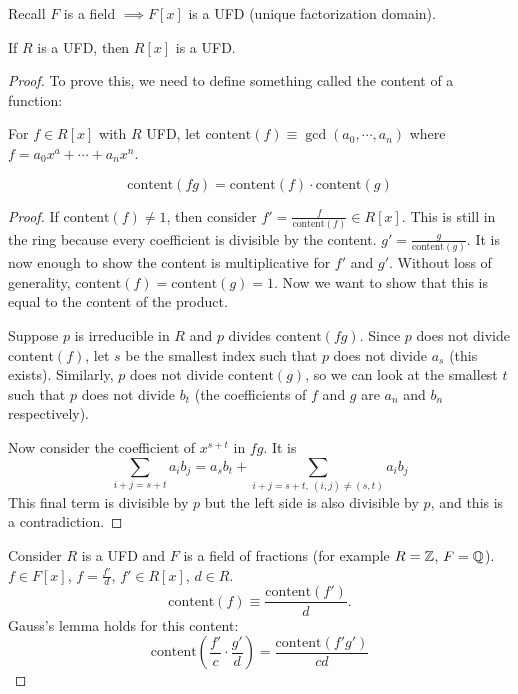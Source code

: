 \documentclass[a4paper,twoside,master.tex]{subfiles}
\begin{document}
Recall $ F $ is a field $ \implies F[x] $ is a UFD (unique factorization domain).
\begin{theorem}
    If $ R $ is a UFD, then $ R[x] $ is a UFD.
\end{theorem}
\begin{proof}
    To prove this, we need to define something called the content of a function:
    \begin{definition}
        For $ f \in R[x] $ with $ R $ UFD, let $ \text{content}(f) \equiv \gcd(a_0 ,\cdots, a_n) $ where $ f = a_0 x^a + \cdots + a_n x^n $.
    \end{definition}
    \begin{lemma}
        \begin{equation}
            \text{content}(fg) = \text{content}(f) \cdot \text{content}(g)
        \end{equation}
    \end{lemma}
    \begin{proof}
        If $ \text{content}(f) \neq 1 $, then consider $ f' = \frac{f}{\text{content}(f)} \in R[x] $. This is still in the ring because every coefficient is divisible by the content. $ g' = \frac{g}{\text{content}(g)} $. It is now enough to show the content is multiplicative for $ f' $ and $ g' $. Without loss of generality, $ \text{content}(f) = \text{content}(g) = 1 $. Now we want to show that this is equal to the content of the product.

        Suppose $ p $ is irreducible in $ R $ and $ p $ divides $ \text{content}(fg) $. Since $ p $ does not divide $ \text{content}(f) $, let $ s $ be the smallest index such that $ p $ does not divide $ a_s $ (this exists). Similarly, $ p $ does not divide $ \text{content}(g) $, so we can look at the smallest $ t $ such that $ p $ does not divide $ b_t $ (the coefficients of $ f $ and $ g $ are $ a_n $ and $ b_n $ respectively).

        Now consider the coefficient of $ x^{s+t} $ in $ fg $. It is 
        \begin{equation}
            \sum_{i+j = s + t} a_i b_j = a_s b_t + \sum_{i+j = s + t,\ (i,j) \neq (s,t)} a_i b_j
        \end{equation}
        This final term is divisible by $ p $ but the left side is also divisible by $ p $, and this is a contradiction.
    \end{proof}
    Consider $ R $ is a UFD and $ F $ is a field of fractions (for example $ R = \mathbb{Z} $, $ F = \mathbb{Q} $). $ f \in F[x] $, $ f = \frac{f'}{d} $, $ f' \in R[x] $, $ d \in R $.
    \begin{equation}
        \text{content}(f) \equiv \frac{\text{content}(f')}{d}.
    \end{equation}
    Gauss's lemma holds for this content:
    \begin{equation}
        \text{content}\left( \frac{f'}{c} \cdot \frac{g'}{d} \right) = \frac{\text{content}(f'g')}{c d}
    \end{equation}


\end{proof}
\end{document}
